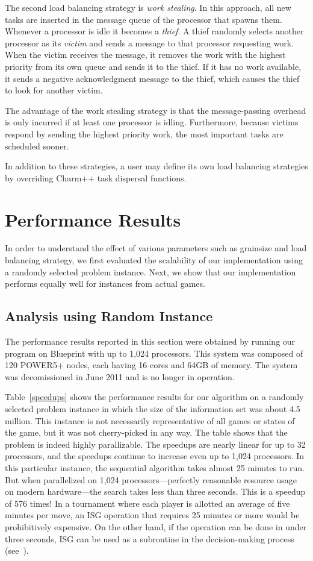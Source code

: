 \documentclass[10pt, conference, compsocconf]{IEEEtran}
\begin{document}
The second load balancing strategy is {\em work stealing}.  In this
approach, all new tasks are inserted in the message queue of the processor that
spawns them.  Whenever a processor is idle it becomes a {\em thief}.  A thief
randomly selects another processor as its {\em victim} and sends a message to
that processor requesting work.  When the victim receives the message, it
removes the work with the highest priority from its own queue and sends it to
the thief.  If it has no work available, it sends a negative acknowledgment
message to the thief, which causes the thief to look for another victim.

The advantage of the work stealing strategy is that the message-passing
overhead is only incurred if at least one processor is idling.  Furthermore,
because victims respond by sending the highest priority work, the most
important tasks are scheduled sooner.  

In addition to these strategies, a user may define its own load balancing
strategies by overriding {\sc Charm++} task dispersal functions.


\section{Performance Results}\label{Results}
In order to understand the effect of various parameters such as grainsize and
load balancing strategy, we first evaluated the scalability of our
implementation using a randomly selected problem instance. Next, we show that
our implementation performs equally well for instances from actual games.

\subsection{Analysis using Random Instance} 
The performance results reported in this section were obtained by running our
program on Blueprint with up to 1,024 processors. This system was composed of
120 POWER5+ nodes, each having 16 cores and 64GB of memory. The system was
decomissioned in June 2011 and is no longer in operation.

Table~\ref{speedups} shows the performance results for our algorithm on a
randomly selected problem instance in which the size of the information set was
about 4.5 million.  This instance is not necessarily representative of all
games or states of the game, but it was not cherry-picked in any way. The table
shows that the problem is indeed highly parallizable. The speedups are nearly
linear for up to 32 processors, and the speedups continue to increase even up
to 1,024 processors. In this particular instance, the sequential algorithm
takes almost 25 minutes to run.  But when parallelized on 1,024
processors---perfectly reasonable resource usage on modern hardware---the
search takes less than three seconds.  This is a speedup of 576 times! In a
tournament where each player is allotted an average of five minutes per move,
an ISG operation that requires 25 minutes or more would be prohibitively
expensive.  On the other hand, if the operation can be done in under three
seconds, ISG can be used as a subroutine in the decision-making process
(see~\cite{parker05game}). 
\end{document}
